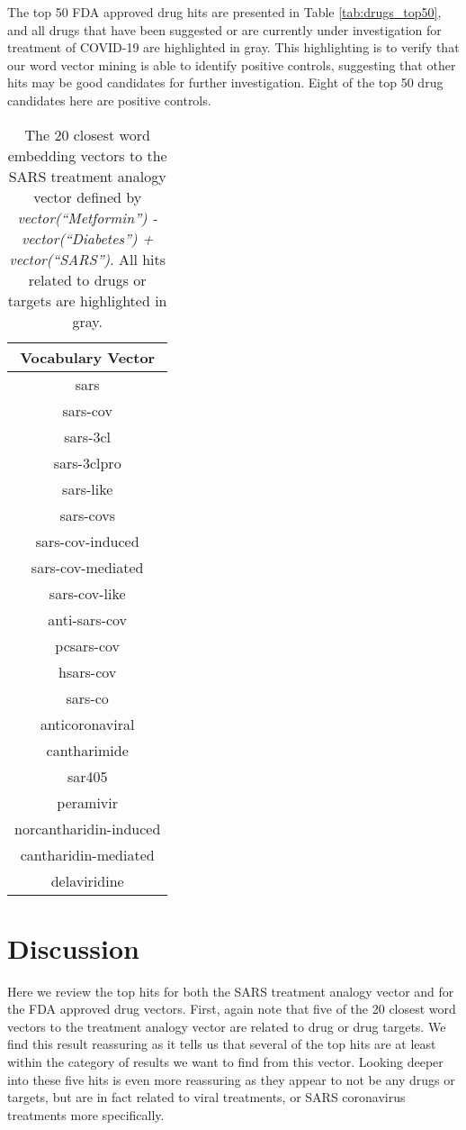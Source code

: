 \documentclass{article}
\newcommand{\lgc}[1]{\cellcolor[gray]{0.85}#1}
\begin{document}
The top 50 FDA approved drug hits are presented in Table \ref{tab:drugs_top50}, and all drugs that have been suggested or are currently under investigation for treatment of COVID-19 are highlighted in gray.
This highlighting is to verify that our word vector mining is able to identify positive controls, suggesting that other hits may be good candidates for further investigation.
Eight of the top 50 drug candidates here are positive controls.


\begin{table}[t!]
\footnotesize
\centering
\caption{The 20 closest word embedding vectors to the SARS treatment analogy vector defined by \emph{vector(``Metformin'') - vector(``Diabetes'') + vector(``SARS'')}. All hits related to drugs or targets are highlighted in gray.}
\label{tab:analogy_top20}
\begin{tabular}{c}
\hline
Vocabulary Vector \\
\hline
sars \\
sars-cov \\
\lgc{sars-3cl} \\
\lgc{sars-3clpro} \\
sars-like \\
sars-covs \\
sars-cov-induced \\
sars-cov-mediated \\
sars-cov-like \\
anti-sars-cov \\
pcsars-cov \\
hsars-cov \\
sars-co \\
anticoronaviral \\
\lgc{cantharimide} \\
sar405 \\
\lgc{peramivir} \\
norcantharidin-induced \\
cantharidin-mediated \\
\lgc{delaviridine} \\
\hline
\end{tabular}
\end{table}

\section{Discussion}

Here we review the top hits for both the SARS treatment analogy vector and for the FDA approved drug vectors.
First, again note that five of the 20 closest word vectors to the treatment analogy vector are related to drug or drug targets.
We find this result reassuring as it tells us that several of the top hits are at least within the category of results we want to find from this vector.
Looking deeper into these five hits is even more reassuring as they appear to not be any drugs or targets, but are in fact related to viral treatments, or SARS coronavirus treatments more specifically.
\end{document}
